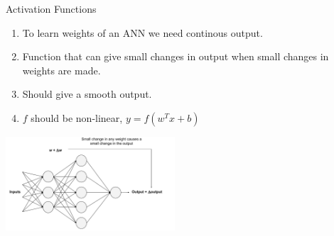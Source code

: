 \documentclass[handout]{beamer}
\begin{document}
\begin{frame}{Activation Functions}
  \begin{enumerate}
    \item To learn weights of an ANN we need continous output. \\

    \item Function that can give small changes in output when small changes in weights are made. \\

    \item Should give a smooth output. \\

    \item $f$ should be non-linear, $y = f(w^Tx+b)$ \\
  \end{enumerate}
  \begin{center}
    \includegraphics[width=0.65\linewidth, height=3.5cm]{images/anns_change}
  \end{center}
\end{frame}
\end{document}
